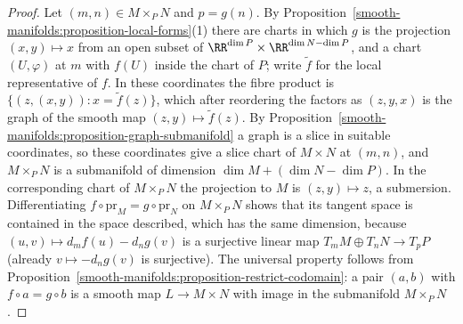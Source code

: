\begin{proof}
Let $(m, n) \in M \times_PN$ and $p = g(n)$. By Proposition~\ref{smooth-manifolds:proposition-local-forms}(1) there are charts in which $g$ is the projection
$(x, y) \mapsto x$ from an open subset of $\RR^{\dim P} \times \RR^{\dim N - \dim P}$, and a chart $(U, \varphi)$ at $m$ with $f(U)$ inside the chart of $P$; write
$\tilde{f}$ for the local representative of $f$. In these coordinates the fibre product is
$\{(z, (x, y)) : x = \tilde{f}(z)\}$, which after reordering the factors as $(z, y, x)$ is the graph of the smooth map $(z, y) \mapsto \tilde{f}(z)$. By
Proposition~\ref{smooth-manifolds:proposition-graph-submanifold} a graph is a slice in suitable coordinates, so these coordinates give a slice chart of
$M \times N$ at $(m, n)$, and $M \times_PN$ is a submanifold of dimension $\dim M + (\dim N - \dim P)$. In the corresponding chart of $M \times_PN$ the projection
to $M$ is $(z, y) \mapsto z$, a submersion. Differentiating $f \circ \mathrm{pr}_M = g \circ \mathrm{pr}_N$ on $M \times_PN$ shows that its tangent space is
contained in the space described, which has the same dimension, because $(u, v) \mapsto d_mf(u) - d_ng(v)$ is a surjective linear map $T_mM \oplus T_nN \to T_pP$
(already $v \mapsto -d_ng(v)$ is surjective). The universal property follows from
Proposition~\ref{smooth-manifolds:proposition-restrict-codomain}: a pair $(a, b)$ with $f \circ a = g \circ b$ is a smooth map $L \to M \times N$ with image in the
submanifold $M \times_PN$.
\end{proof}

